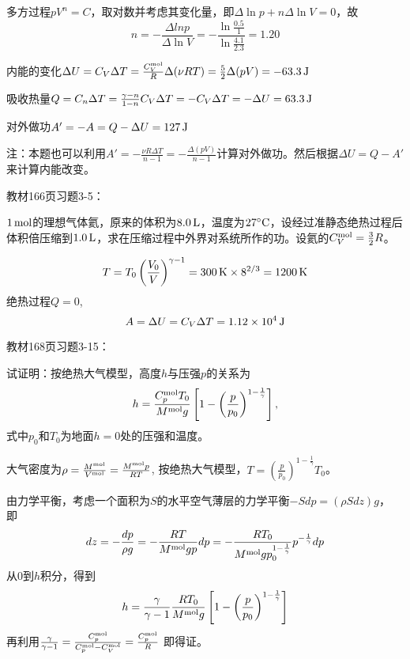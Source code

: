 \documentclass[CJK]{beamer}
\begin{document}
\begin{frame}
  \bch
      {\small
        \bitem
      \item{
        多方过程$pV^n = C$，取对数并考虑其变化量，即$\Delta \ln p + n \Delta \ln V = 0$，故
        $$n = - \frac{\Delta ln p}{\Delta \ln V} = -\frac{\ln\frac{0.5}{1}}{\ln\frac{4.1}{2.3}} = 1.20 $$}
      \item{内能的变化$\Delta U  = C_V\Delta T = \frac{C_V^{\rm mol}}{R}\Delta (\nu RT) = \frac{5}{2}\Delta(pV) = -63.3\,\mathrm{J}$}
      \item{吸收热量$Q = C_n \Delta T = \frac{\gamma-n}{1-n}C_V\Delta T = -C_V\Delta T = -\Delta U = 63.3\,\mathrm{J}$}
      \item{对外做功$A'=-A = Q-\Delta U = 127\,\mathrm{J}$}
        \eitem
        \skipline
        
注：本题也可以利用$A' = -\frac{\nu R \Delta T}{n-1} =-\frac{\Delta(pV)}{n-1}$计算对外做功。然后根据$\Delta U = Q-A'$来计算内能改变。        
  }
  \ech
\end{frame}

\begin{frame}
  \chtitle{\proid (\sone)}
  \bch
  教材166页习题3-5：

  $1\,\mathrm{mol}$的理想气体氦，原来的体积为$8.0\,\mathrm{L}$，温度为$27^\circ \mathrm{C}$，设经过准静态绝热过程后体积倍压缩到$1.0\,\mathrm{L}$，求在压缩过程中外界对系统所作的功。设氦的$C_V^{\rm mol} = \frac{3}{2}R$。
  \ech
\end{frame}

\begin{frame}
  \bch
  $$T=T_0\left(\frac{V_0}{V}\right)^{\gamma-1} = 300\,\mathrm{K}\times 8^{2/3} = 1200\,\mathrm{K} $$
  绝热过程$Q=0$,
  $$A = \Delta U =C_V\Delta T  = 1.12\times 10^4\,\mathrm{J}$$
  \ech
\end{frame}

\begin{frame}
  \chtitle{\proid (\sthree)}
  \bch
  教材168页习题3-15：

  试证明：按绝热大气模型，高度$h$与压强$p$的关系为
  $$ h = \frac{C_p^{\rm mol}T_0}{M^{\rm mol}g}\left[1-\left(\frac{p}{p_0}\right)^{1-\frac{1}{\gamma}}\right],$$
  式中$p_0$和$T_0$为地面$h=0$处的压强和温度。
  \ech
\end{frame}

\begin{frame}
  \bch
  {\small
    大气密度为$ \rho = \frac{M^{\rm mol}}{V^{\rm mol}} = \frac{M^{\rm mol}p}{RT} $,   按绝热大气模型，$T = \left(\frac{p}{p_0}\right)^{1-\frac{1}{\gamma}} T_0$。
    
  由力学平衡，考虑一个面积为$S$的水平空气薄层的力学平衡$-S dp = (\rho S dz)g $， 即
  $$ dz =-\frac{dp}{\rho g} = -\frac{RT }{M^{\rm mol}gp}dp= -\frac{RT_0}{M^{\rm mol}gp_0^{1-\frac{1}{\gamma}}} p^{-\frac{1}{\gamma}} dp$$
  从$0$到$h$积分，得到
  $$ h = \frac{\gamma}{\gamma-1}\frac{RT_0}{M^{\rm mol}g}\left[1-\left(\frac{p}{p_0}\right)^{1-\frac{1}{\gamma}}\right]$$
  再利用$\frac{\gamma}{\gamma-1} = \frac{C_p^{\rm mol}}{C_p^{\rm mol}-C_V^{\rm mol}} = \frac{C_p^{\rm mol}}{R}$
    即得证。
  }
  \ech
\end{frame}
\end{document}
